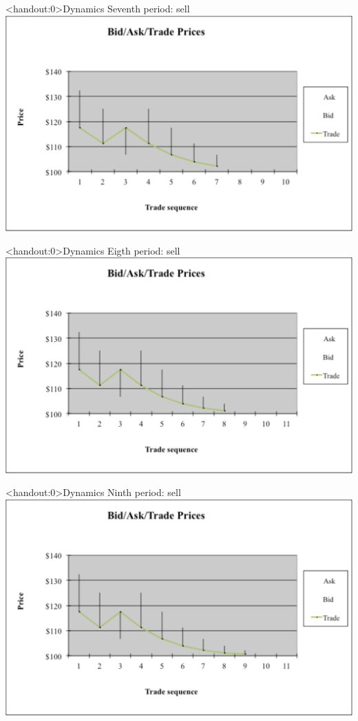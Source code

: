 \documentclass[english,10pt
,aspectratio=169
]{beamer}
\begin{document}
\begin{frame}<handout:0>{Dynamics}
	Seventh period: sell
	\center
	\includegraphics[width=0.9\linewidth]{pics/P7_Image.pdf}
\end{frame}


\begin{frame}<handout:0>{Dynamics}
	Eigth period: sell
	\center
	\includegraphics[width=0.9\linewidth]{pics/P8_Image.pdf}
\end{frame}


\begin{frame}<handout:0>{Dynamics}
	Ninth period: sell
	\center
	\includegraphics[width=0.9\linewidth]{pics/P9_Image.pdf}
\end{frame}
\end{document}
